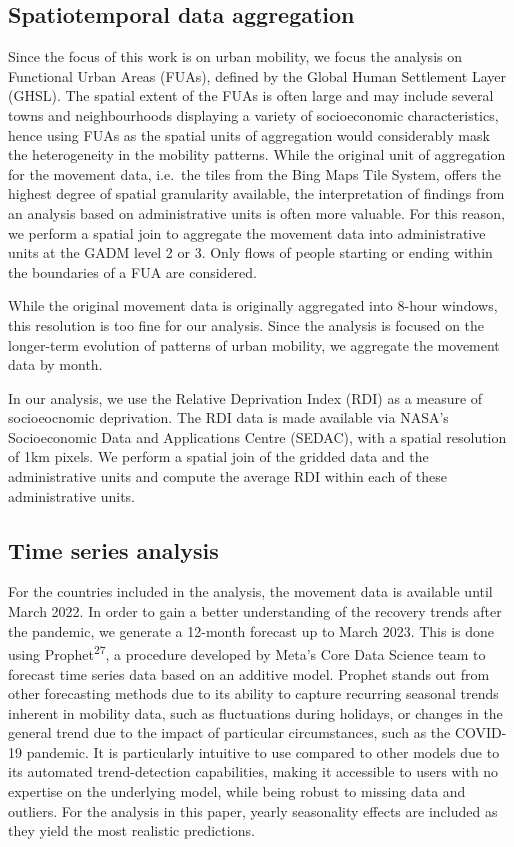 \documentclass[
  11pt,
]{article}
\begin{document}
\hypertarget{spatiotemporal-data-aggregation}{%
\subsection{Spatiotemporal data
aggregation}\label{spatiotemporal-data-aggregation}}

Since the focus of this work is on urban mobility, we focus the analysis
on Functional Urban Areas (FUAs), defined by the Global Human Settlement
Layer (GHSL). The spatial extent of the FUAs is often large and may
include several towns and neighbourhoods displaying a variety of
socioeconomic characteristics, hence using FUAs as the spatial units of
aggregation would considerably mask the heterogeneity in the mobility
patterns. While the original unit of aggregation for the movement data,
i.e.~the tiles from the Bing Maps Tile System, offers the highest degree
of spatial granularity available, the interpretation of findings from an
analysis based on administrative units is often more valuable. For this
reason, we perform a spatial join to aggregate the movement data into
administrative units at the GADM level 2 or 3. Only flows of people
starting or ending within the boundaries of a FUA are considered.

While the original movement data is originally aggregated into 8-hour
windows, this resolution is too fine for our analysis. Since the
analysis is focused on the longer-term evolution of patterns of urban
mobility, we aggregate the movement data by month.

In our analysis, we use the Relative Deprivation Index (RDI) as a
measure of socioeocnomic deprivation. The RDI data is made available via
NASA's Socioeconomic Data and Applications Centre (SEDAC), with a
spatial resolution of 1km pixels. We perform a spatial join of the
gridded data and the administrative units and compute the average RDI
within each of these administrative units.

\hypertarget{time-series-analysis}{%
\subsection{Time series analysis}\label{time-series-analysis}}

For the countries included in the analysis, the movement data is
available until March 2022. In order to gain a better understanding of
the recovery trends after the pandemic, we generate a 12-month forecast
up to March 2023. This is done using Prophet\textsuperscript{27}, a
procedure developed by Meta's Core Data Science team to forecast time
series data based on an additive model. Prophet stands out from other
forecasting methods due to its ability to capture recurring seasonal
trends inherent in mobility data, such as fluctuations during holidays,
or changes in the general trend due to the impact of particular
circumstances, such as the COVID-19 pandemic. It is particularly
intuitive to use compared to other models due to its automated
trend-detection capabilities, making it accessible to users with no
expertise on the underlying model, while being robust to missing data
and outliers. For the analysis in this paper, yearly seasonality effects
are included as they yield the most realistic predictions.
\end{document}

